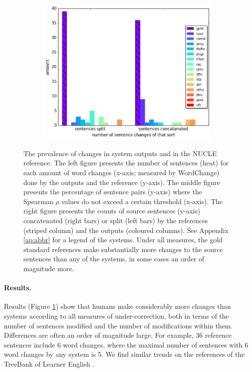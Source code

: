 \documentclass[11pt, a4paper]{article}
\begin{document}
\begin{figure}
\begin{subfigure}[]{0.6\columnwidth}
		\includegraphics[width = \textwidth]{aligned}
	\end{subfigure}
	\caption{\label{fig:over-conservatism}
		The prevalence of changes in system outputs and in the NUCLE reference.
		The left figure presents the number of sentences (heat) for each amount of word changes
		(x-axis; measured by {\sc WordChange}) done by the outputs and the reference (y-axis).
		The middle figure presents the percentage of sentence pairs (y-axis) where the
		Spearman $\rho$ values do not exceed a certain threshold (x-axis).
		The right figure presents the counts of source sentences (y-axis) concatenated (right bars) or split (left bars) by the references (striped column) and the outputs (coloured columns).
		See Appendix \ref{ap:abbr} for a legend of the systems.
		Under all measures, the gold standard references make substantially more changes to the source sentences than any of the systems, in some cases an order of magnitude more.
	}
\end{figure}

\paragraph{Results.} \hspace{-.5cm}
Results (Figure \ref{fig:over-conservatism}) show that humans make considerably more changes than systems according to all measures of under-correction, 
both in terms of the number of sentences modified and the number of modifications within them. Differences are often an order of magnitude large.
For example, 36 reference sentences include 6 word changes, where the maximal number of sentences with 6 word changes by any system is 5.
We find similar trends on the references of the TreeBank of Learner English \cite{yannakoudakis2011new}.
\end{document}
